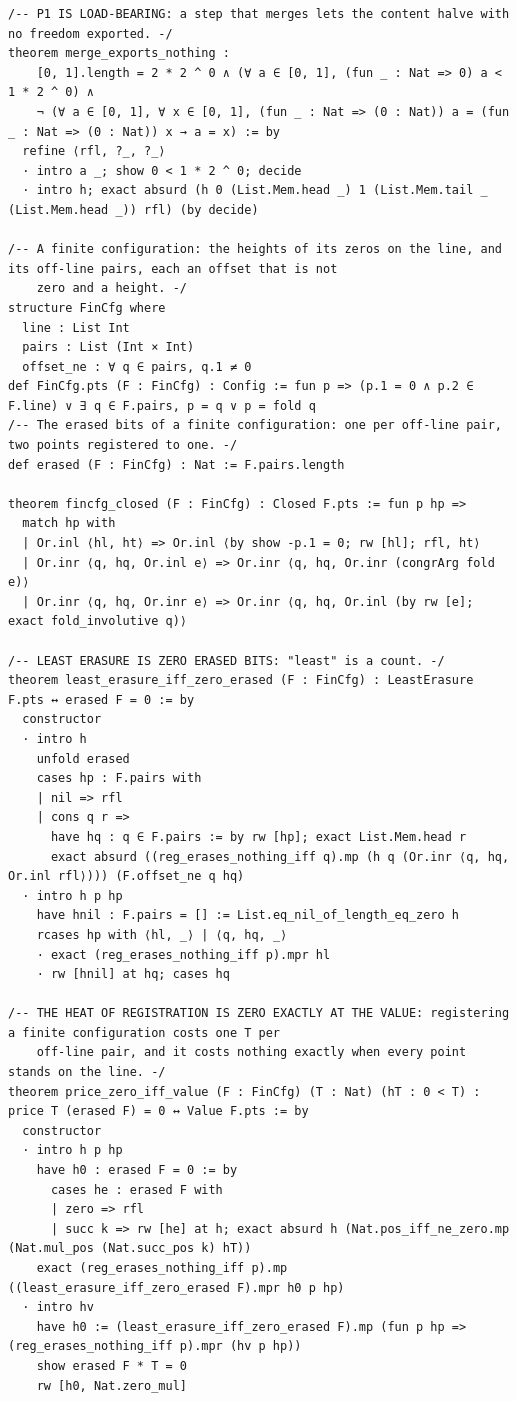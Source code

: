 \documentclass[10pt,twocolumn]{article}
\begin{document}
\begin{Verbatim}
/-- P1 IS LOAD-BEARING: a step that merges lets the content halve with no freedom exported. -/
theorem merge_exports_nothing :
    [0, 1].length = 2 * 2 ^ 0 ∧ (∀ a ∈ [0, 1], (fun _ : Nat => 0) a < 1 * 2 ^ 0) ∧
    ¬ (∀ a ∈ [0, 1], ∀ x ∈ [0, 1], (fun _ : Nat => (0 : Nat)) a = (fun _ : Nat => (0 : Nat)) x → a = x) := by
  refine ⟨rfl, ?_, ?_⟩
  · intro a _; show 0 < 1 * 2 ^ 0; decide
  · intro h; exact absurd (h 0 (List.Mem.head _) 1 (List.Mem.tail _ (List.Mem.head _)) rfl) (by decide)

/-- A finite configuration: the heights of its zeros on the line, and its off-line pairs, each an offset that is not
    zero and a height. -/
structure FinCfg where
  line : List Int
  pairs : List (Int × Int)
  offset_ne : ∀ q ∈ pairs, q.1 ≠ 0
def FinCfg.pts (F : FinCfg) : Config := fun p => (p.1 = 0 ∧ p.2 ∈ F.line) ∨ ∃ q ∈ F.pairs, p = q ∨ p = fold q
/-- The erased bits of a finite configuration: one per off-line pair, two points registered to one. -/
def erased (F : FinCfg) : Nat := F.pairs.length

theorem fincfg_closed (F : FinCfg) : Closed F.pts := fun p hp =>
  match hp with
  | Or.inl ⟨hl, ht⟩ => Or.inl ⟨by show -p.1 = 0; rw [hl]; rfl, ht⟩
  | Or.inr ⟨q, hq, Or.inl e⟩ => Or.inr ⟨q, hq, Or.inr (congrArg fold e)⟩
  | Or.inr ⟨q, hq, Or.inr e⟩ => Or.inr ⟨q, hq, Or.inl (by rw [e]; exact fold_involutive q)⟩

/-- LEAST ERASURE IS ZERO ERASED BITS: "least" is a count. -/
theorem least_erasure_iff_zero_erased (F : FinCfg) : LeastErasure F.pts ↔ erased F = 0 := by
  constructor
  · intro h
    unfold erased
    cases hp : F.pairs with
    | nil => rfl
    | cons q r =>
      have hq : q ∈ F.pairs := by rw [hp]; exact List.Mem.head r
      exact absurd ((reg_erases_nothing_iff q).mp (h q (Or.inr ⟨q, hq, Or.inl rfl⟩))) (F.offset_ne q hq)
  · intro h p hp
    have hnil : F.pairs = [] := List.eq_nil_of_length_eq_zero h
    rcases hp with ⟨hl, _⟩ | ⟨q, hq, _⟩
    · exact (reg_erases_nothing_iff p).mpr hl
    · rw [hnil] at hq; cases hq

/-- THE HEAT OF REGISTRATION IS ZERO EXACTLY AT THE VALUE: registering a finite configuration costs one T per
    off-line pair, and it costs nothing exactly when every point stands on the line. -/
theorem price_zero_iff_value (F : FinCfg) (T : Nat) (hT : 0 < T) : price T (erased F) = 0 ↔ Value F.pts := by
  constructor
  · intro h p hp
    have h0 : erased F = 0 := by
      cases he : erased F with
      | zero => rfl
      | succ k => rw [he] at h; exact absurd h (Nat.pos_iff_ne_zero.mp (Nat.mul_pos (Nat.succ_pos k) hT))
    exact (reg_erases_nothing_iff p).mp ((least_erasure_iff_zero_erased F).mpr h0 p hp)
  · intro hv
    have h0 := (least_erasure_iff_zero_erased F).mp (fun p hp => (reg_erases_nothing_iff p).mpr (hv p hp))
    show erased F * T = 0
    rw [h0, Nat.zero_mul]


\end{Verbatim}
\end{document}
